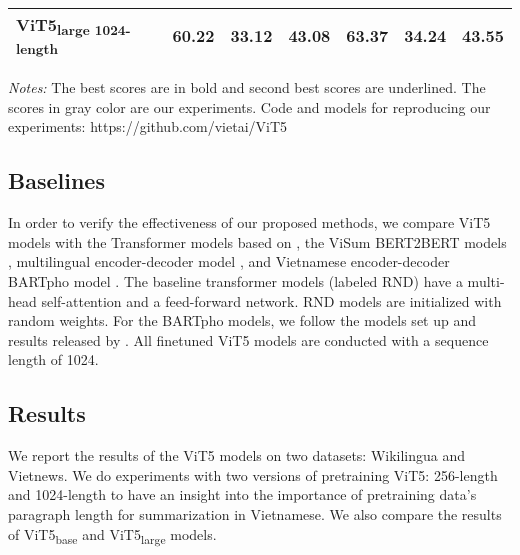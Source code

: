 \documentclass[11pt,a4paper]{article}
\begin{document}
\begin{table*}[ht]
\begin{threeparttable}
\begin{tabular}{l|lll|lll}
ViT5\textsubscript{large 1024-length}                                          & \textbf{60.22} & \textbf{33.12} & \textbf{43.08} & \textbf{63.37} & \textbf{34.24} & \textbf{43.55} \\ \hline
\end{tabular}
\begin{tablenotes}
      \small
      \item \textit{Notes:} The best scores are in bold and second best scores are underlined. The scores in gray color are our experiments. Code and models for reproducing our experiments: https://github.com/vietai/ViT5

\end{tablenotes}
\end{threeparttable}
\label{wikilingua}

\end{table*}













%
 
\subsection{Baselines}

In order to verify the effectiveness of our proposed methods, we compare ViT5 models with the Transformer models based on \cite{attention}, the ViSum BERT2BERT models \cite{nguyen2021viesum}, multilingual encoder-decoder model \cite{mT5, mbart}, and Vietnamese encoder-decoder BARTpho model \cite{bartpho}. The baseline transformer models (labeled RND) have a multi-head self-attention and a feed-forward network. RND models are initialized with random weights. 
For the BARTpho models, we follow the models set up and results released by \cite{bartpho}. All finetuned ViT5 models are conducted with a sequence length of 1024.
 
\subsection{Results}
\label{wikilingua_task}
We report the results of the ViT5 models on two datasets: Wikilingua and Vietnews. We do experiments with two versions of pretraining ViT5: 256-length and 1024-length to have an insight into the importance of pretraining data's paragraph length for summarization in Vietnamese. We also compare the results of ViT5\textsubscript{base} and ViT5\textsubscript{large} models.
\end{document}
